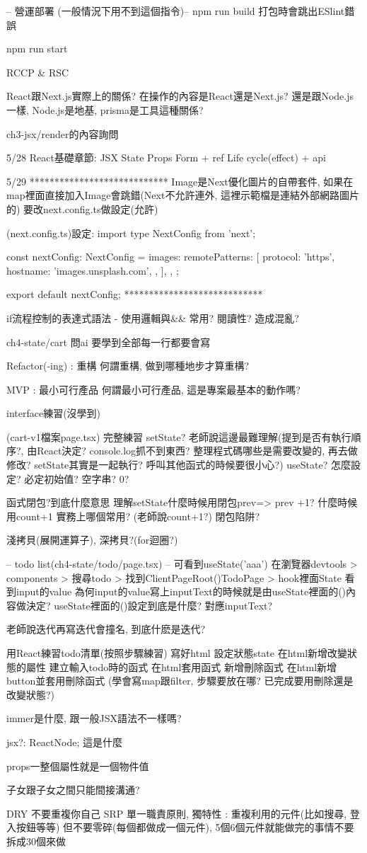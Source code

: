 -- 營運部署 (一般情況下用不到這個指令)--
npm run build
打包時會跳出ESlint錯誤

npm run start

RCCP & RSC

React跟Next.js實際上的關係?
在操作的內容是React還是Next.js?
還是跟Node.js一樣, Node.js是地基, prisma是工具這種關係?

ch3-jsx/render的內容詢問

5/28
React基礎章節:
JSX
State
Props
Form + ref
Life cycle(effect) + api

5/29
****************************
Image是Next優化圖片的自帶套件,
如果在map裡面直接加入Image會跳錯(Next不允許連外, 這裡示範檔是連結外部網路圖片的)
要改next.config.ts做設定(允許)

(next.config.ts)設定:
import type { NextConfig } from 'next';

const nextConfig: NextConfig = {
  images: {
    remotePatterns: [
      {
        protocol: 'https',
        hostname: 'images.unsplash.com',
      },
    ],
  },
};

export default nextConfig;
****************************

if流程控制的表達式語法 - 使用邏輯與&&
常用? 閱讀性? 造成混亂?

ch4-state/cart
問ai 要學到全部每一行都要會寫


Refactor(-ing) : 重構
何謂重構, 做到哪種地步才算重構?

MVP : 最小可行產品
何謂最小可行產品, 這是專案最基本的動作嗎?

interface練習(沒學到)

(cart-v1檔案page.tsx) 完整練習
setState? 老師說這邊最難理解(提到是否有執行順序?, 由React決定? console.log抓不到東西? 整理程式碼哪些是需要改變的, 再去做修改? setState其實是一起執行? 呼叫其他函式的時候要很小心?)
useState? 怎麼設定? 必定初始值? 空字串? 0?

函式閉包?到底什麼意思
理解setState什麼時候用閉包prev=> prev +1? 什麼時候用count+1 實務上哪個常用? (老師說count+1?)
閉包陷阱?

淺拷貝(展開運算子), 深拷貝?(for迴圈?)

-- todo list(ch4-state/todo/page.tsx) --
可看到useState('aaa')
在瀏覽器devtools > components > 搜尋todo > 找到ClientPageRoot()TodoPage > hook裡面State
看到input的value
為何input的value寫上{inputText}的時候就是由useState裡面的()內容做決定? useState裡面的()設定到底是什麼? 對應inputText?

老師說迭代再寫迭代會撞名, 到底什麽是迭代?

用React練習todo清單(按照步驟練習)
寫好html
設定狀態state
在html新增改變狀態的屬性
建立輸入todo時的函式
在html套用函式
新增刪除函式
在html新增button並套用刪除函式
(學會寫map跟filter, 步驟要放在哪? 已完成要用刪除還是改變狀態?)

immer是什麼, 跟一般JSX語法不一樣嗎?

jsx?: ReactNode; 這是什麼

props一整個屬性就是一個物件值

子女跟子女之間只能間接溝通?

DRY 不要重複你自己
SRP 單一職責原則, 獨特性 : 重複利用的元件(比如搜尋, 登入按鈕等等) 但不要零碎(每個都做成一個元件), 5個6個元件就能做完的事情不要拆成30個來做